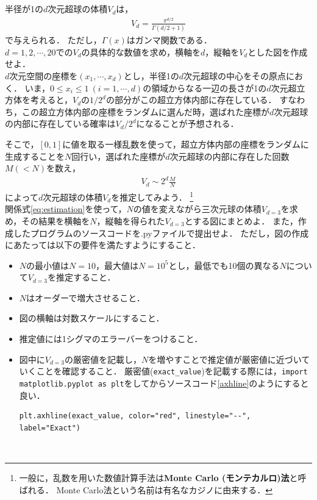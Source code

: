 \documentclass[a4paper,12pt]{jsarticle}
\begin{document}
\section{}
\label{sec:problem_4}


半径が1の$d$次元超球の体積$V_{d}$は，
\begin{align}
\label{eq:exact_vd}
    V_{d}=\frac{\pi^{d/2}}{\Gamma(d/2+1)}
\end{align}
で与えられる．
ただし，$\Gamma(x)$はガンマ関数である．\\

$d=1,2,\cdots,20$での$V_{d}$の具体的な数値を求め，横軸を$d$，縦軸を$V_{d}$とした図を作成せよ．\\


$d$次元空間の座標を$(x_{1},\cdots,x_{d})$とし，半径1の$d$次元超球の中心をその原点におく．
いま，$0\le x_{i}\le1~(i=1,\cdots,d)$の領域からなる一辺の長さが1の$d$次元超立方体を考えると，$V_{d}$の$1/2^{d}$の部分がこの超立方体内部に存在している．
すなわち，この超立方体内部の座標をランダムに選んだ時，選ばれた座標が$d$次元超球の内部に存在している確率は$V_{d}/2^{d}$になることが予想される．

そこで，$[0,1]$に値を取る一様乱数を使って，超立方体内部の座標をランダムに生成することを$N$回行い，選ばれた座標が$d$次元超球の内部に存在した回数$M(<N)$を数え，
\begin{align}
\label{eq:estimation}
    V_{d}\sim2^{d}\frac{M}{N}
\end{align}
によって$d$次元超球の体積$V_{d}$を推定してみよう．
\footnote{
一般に，乱数を用いた数値計算手法は{\bf Monte Carlo (モンテカルロ)法}と呼ばれる．
Monte Carlo法という名前は有名なカジノに由来する．
}
\\

関係式\eqref{eq:estimation}を使って，$N$の値を変えながら三次元球の体積$V_{d=3}$を求め，その結果を横軸を$N$，縦軸を得られた$V_{d=3}$とする図にまとめよ．
また，作成したプログラムのソースコードを.pyファイルで提出せよ．
ただし，図の作成にあたっては以下の要件を満たすようにすること．
\begin{itemize}
    \item $N$の最小値は$N=10$，最大値は$N=10^{5}$とし，最低でも10個の異なる$N$について$V_{d=3}$を推定すること．
    \item $N$はオーダーで増大させること．
    \item 図の横軸は対数スケールにすること．
    \item 推定値には1シグマのエラーバーをつけること．
    \item 図中に$V_{d=3}$の厳密値を記載し，$N$を増やすことで推定値が厳密値に近づいていくことを確認すること．
    厳密値(\texttt{exact\_value})を記載する際には，\texttt{import matplotlib.pyplot as plt}をしてからソースコード\ref{axhline}のようにすると良い．
    \begin{lstlisting}[caption=厳密解を直線でプロット,label=axhline]
    plt.axhline(exact_value, color="red", linestyle="--", label="Exact")
    \end{lstlisting}
\end{itemize}
~\\
\end{document}
